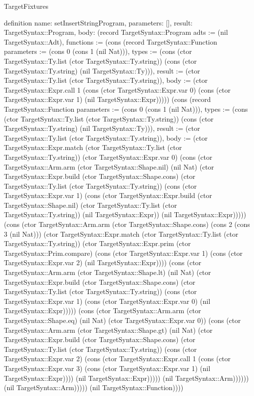 \begin{lexlean}{TargetFixtures}
\begin{semanticmodule}
definition{
  name: setInsertStringProgram,
  parameters: [],
  result: TargetSyntax::Program,
  body: (record TargetSyntax::Program {adts := (nil TargetSyntax::Adt), functions := (cons (record TargetSyntax::Function {parameters := (cons 0 (cons 1 (nil Nat))), types := (cons (ctor TargetSyntax::Ty.list (ctor TargetSyntax::Ty.string)) (cons (ctor TargetSyntax::Ty.string) (nil TargetSyntax::Ty))), result := (ctor TargetSyntax::Ty.list (ctor TargetSyntax::Ty.string)), body := (ctor TargetSyntax::Expr.call 1 (cons (ctor TargetSyntax::Expr.var 0) (cons (ctor TargetSyntax::Expr.var 1) (nil TargetSyntax::Expr))))}) (cons (record TargetSyntax::Function {parameters := (cons 0 (cons 1 (nil Nat))), types := (cons (ctor TargetSyntax::Ty.list (ctor TargetSyntax::Ty.string)) (cons (ctor TargetSyntax::Ty.string) (nil TargetSyntax::Ty))), result := (ctor TargetSyntax::Ty.list (ctor TargetSyntax::Ty.string)), body := (ctor TargetSyntax::Expr.match (ctor TargetSyntax::Ty.list (ctor TargetSyntax::Ty.string)) (ctor TargetSyntax::Expr.var 0) (cons (ctor TargetSyntax::Arm.arm (ctor TargetSyntax::Shape.nil) (nil Nat) (ctor TargetSyntax::Expr.build (ctor TargetSyntax::Shape.cons) (ctor TargetSyntax::Ty.list (ctor TargetSyntax::Ty.string)) (cons (ctor TargetSyntax::Expr.var 1) (cons (ctor TargetSyntax::Expr.build (ctor TargetSyntax::Shape.nil) (ctor TargetSyntax::Ty.list (ctor TargetSyntax::Ty.string)) (nil TargetSyntax::Expr)) (nil TargetSyntax::Expr))))) (cons (ctor TargetSyntax::Arm.arm (ctor TargetSyntax::Shape.cons) (cons 2 (cons 3 (nil Nat))) (ctor TargetSyntax::Expr.match (ctor TargetSyntax::Ty.list (ctor TargetSyntax::Ty.string)) (ctor TargetSyntax::Expr.prim (ctor TargetSyntax::Prim.compare) (cons (ctor TargetSyntax::Expr.var 1) (cons (ctor TargetSyntax::Expr.var 2) (nil TargetSyntax::Expr)))) (cons (ctor TargetSyntax::Arm.arm (ctor TargetSyntax::Shape.lt) (nil Nat) (ctor TargetSyntax::Expr.build (ctor TargetSyntax::Shape.cons) (ctor TargetSyntax::Ty.list (ctor TargetSyntax::Ty.string)) (cons (ctor TargetSyntax::Expr.var 1) (cons (ctor TargetSyntax::Expr.var 0) (nil TargetSyntax::Expr))))) (cons (ctor TargetSyntax::Arm.arm (ctor TargetSyntax::Shape.eq) (nil Nat) (ctor TargetSyntax::Expr.var 0)) (cons (ctor TargetSyntax::Arm.arm (ctor TargetSyntax::Shape.gt) (nil Nat) (ctor TargetSyntax::Expr.build (ctor TargetSyntax::Shape.cons) (ctor TargetSyntax::Ty.list (ctor TargetSyntax::Ty.string)) (cons (ctor TargetSyntax::Expr.var 2) (cons (ctor TargetSyntax::Expr.call 1 (cons (ctor TargetSyntax::Expr.var 3) (cons (ctor TargetSyntax::Expr.var 1) (nil TargetSyntax::Expr)))) (nil TargetSyntax::Expr))))) (nil TargetSyntax::Arm)))))) (nil TargetSyntax::Arm))))}) (nil TargetSyntax::Function)))})
}


\end{semanticmodule}
\end{lexlean}
